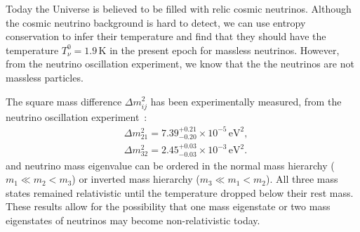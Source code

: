 Today the Universe is believed to be filled with relic cosmic neutrinos. Although the cosmic neutrino background is hard to detect, we can use entropy conservation to infer their temperature and find that they should have the temperature $T_\nu^0=1.9\,\mathrm{K}$ in the present epoch for  massless neutrinos. However, from the neutrino oscillation experiment, we know that the the neutrinos are not massless particles. 

The square mass difference $\Delta m^2_{ij}$ has been experimentally measured, from the neutrino oscillation experiment~\cite{ParticleDataGroup:2022pth}:
\begin{align}
&\Delta{m}_{21}^2=7.39^{+0.21}_{-0.20}\times10^{-5}\,\mathrm{eV}^2,\\
&\Delta{m}_{32}^2=2.45^{+0.03}_{-0.03}\times10^{-3}\,\mathrm{eV}^2.
\end{align}
and neutrino mass eigenvalue can be ordered in the normal mass hierarchy ($m_1\ll m_2<m_3$) or inverted mass hierarchy ($m_3\ll m_1<m_2$). All three mass states remained relativistic until the temperature dropped below their rest mass. These results allow for the possibility that one mass eigenstate or two mass eigenstates of neutrinos may become non-relativistic today. 







